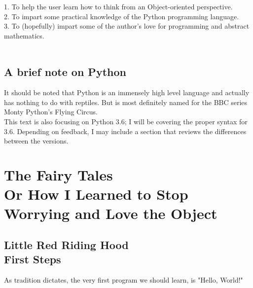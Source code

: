 \documentclass[oneside,12pt]{memoir} %
\begin{document}
1. To help the user learn how to think from an Object-oriented perspective. \\
2. To impart some practical knowledge of the Python programming language. \\
3. To (hopefully) impart some of the author's love for programming and abstract mathematics. \\
\\

\chapter*{A brief note on Python} %

	It should be noted that Python is an immensely high level language and actually has nothing to do with reptiles. But is most definitely named for the BBC series Monty Python's Flying Circus. \\
	
	This text is also focusing on Python 3.6; I will be covering the proper syntax for 3.6. Depending on feedback, I may include a section that reviews the differences between the versions. 





\part{%
The Fairy Tales	\\
\large Or How I Learned to Stop \\
		Worrying and Love the Object}


\chapter{%
Little Red Riding Hood \\
\large First Steps}


As tradition dictates, the very first program we should learn, is "Hello, World!"
\end{document}

